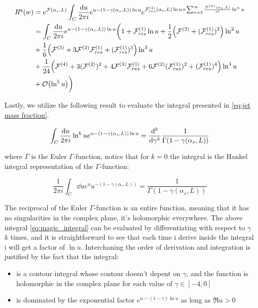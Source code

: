 \documentclass[../main.tex]{subfiles}
\begin{document}
\begin{align}
    \begin{split}
        R^q(w) &= e^{\mathcal{F}(\alpha_s,L)} \int_C \frac{\dd u}{2\pi i} e^{u-(1-\gamma(\alpha_s,L))\ln u} e^{\mathcal{F}^{(1)}_{res}(\alpha_s,L) \ln u +\sum_{n=2}^\infty \frac{\mathcal{F}^{(n)}(\alpha_s,L)}{n!}  \ln^n u}\\
        &= \int_C \frac{\dd u}{2\pi i} e^{u-(1-\gamma(\alpha_s,L))\ln u} \biggl( 1 + \mathcal{F}^{(1)}_{res}\ln u +\frac{1}{2}\qty( \mathcal{F}^{(2)}+(\mathcal{F}^{(1)}_{res})^2)\ln^2 u \\
        &+ \frac{1}{6}\qty(\mathcal{F}^{(3)} + 3 \mathcal{F}^{(2)}\mathcal{F}^{(1)}_{res} + (\mathcal{F}^{(1)}_{res})^3 ) \ln^3 u \\
        &+ \frac{1}{24}\qty(\mathcal{F}^{(4)} + 3(\mathcal{F}^{(2)})^2 + 4 \mathcal{F}^{(3)} \mathcal{F}^{(1)}_{res} + 6 \mathcal{F}^{(2)} (\mathcal{F}^{(1)}_{res})^2 + (\mathcal{F}^{(1)}_{res})^4 )\ln^4 u \\
        &+ \order{\ln^5 u} \biggr)
    \end{split}
\end{align}

Lastly, we utilize the following result to evaluate the integral presented in \cref{eq:jet mass fraction}.

\begin{equation}\label{eq:magic_integral}
    \int_C \frac{\dd u}{2\pi i} \ln^k u e^{u-(1-\gamma(\alpha_s,L))\ln u} = \dv[k]{\gamma} \frac{1}{\Gamma(1-\gamma(\alpha_s,L))}
\end{equation}

where $\Gamma$ is the Euler $\Gamma$-function, notice that for $k=0$ the integral is the Hankel integral representation of the $\Gamma$-function:

\begin{equation}\label{eq:hankel_integral_representation}
    \frac{1}{2\pi i}\int_C \dd u e^{u} u^{-(1-\gamma(\alpha_s,L))} = \frac{1}{\Gamma(1-\gamma(\alpha_s,L))}
\end{equation}

The reciprocal of the Euler $\Gamma$-function is an entire function, meaning that it has no singularities in the complex plane, it's holomorphic everywhere.
The above integral \cref{eq:magic_integral} can be evaluated by differentiating with respect to $\gamma$ $k$ times, and it is straightforward to see that each time i derive inside the integral
i will get a factor of $\ln u$. Interchaning the order of derivation and integration is justified by the fact that the integral:
\begin{itemize}
    \item  is a contour integral whose contour doesn't depent on $\gamma$, and the function is holomorphic in the complex plane for each value of $\gamma \in [-4,0]$
    \item  is dominated by the exponential factor $e^{u - (1-\gamma) \ln u}$ as long as $\Re{u}>0$
\end{itemize}
\end{document}
